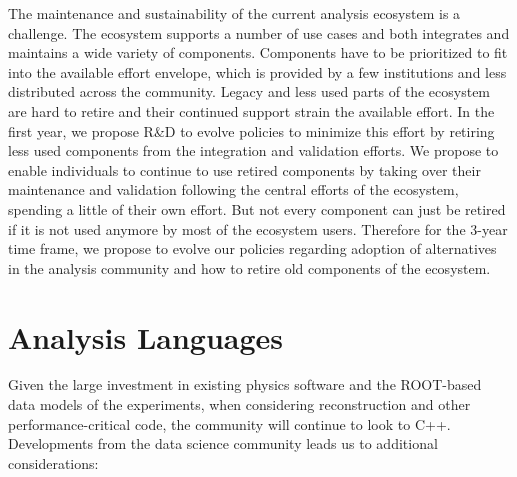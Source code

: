 \documentclass[12pt,a4paper]{article}
\begin{document}
The maintenance and sustainability of the current analysis ecosystem is a challenge. The ecosystem supports a number of use cases and both integrates and maintains a wide variety of components. Components have to be prioritized to fit into the available effort envelope, which is provided by a few institutions and less distributed across the community. Legacy and less used parts of the ecosystem are hard to retire and their continued support strain the available effort. In the first year, we propose R\&D to evolve policies to minimize this effort by retiring less used components from the integration and validation efforts. We propose to enable individuals to continue to use retired components by taking over their maintenance and validation following the central efforts of the ecosystem, spending a little of their own effort. 
But not every component can just be retired if it is not used anymore by most of the ecosystem users. Therefore for the 3-year time frame, we propose to evolve our policies regarding adoption of alternatives in the analysis community and how to retire old components of the ecosystem.

\section{Analysis Languages}

Given the large investment in existing physics software and the ROOT-based data models of the experiments, when considering reconstruction and other performance-critical code, the community will continue to look to C++. Developments from the data science community leads us to additional considerations: 
\end{document}
